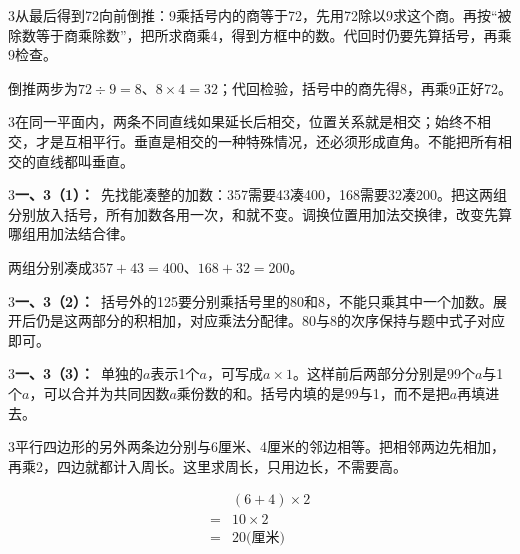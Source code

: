 \documentclass[multi=snippet,border={5bp 20bp 5bp 5bp}]{standalone}
\newenvironment{snippet}[3]{\begin{minipage}{#1bp}\color{answerred}\fontsize{#2}{#3}\selectfont\raggedright}{\end{minipage}}
\begin{document}
\begin{snippet}{505}{11.5}{14}\begin{multicols}{3}\raggedcolumns 从最后得到72向前倒推：9乘括号内的商等于72，先用72除以9求这个商。再按“被除数等于商乘除数”，把所求商乘4，得到方框中的数。代回时仍要先算括号，再乘9检查。\par 倒推两步为\(72\div9=8\)\allowbreak 、\(8\times4=32\)\allowbreak ；代回检验，括号中的商先得8，再乘9正好72。\end{multicols}\end{snippet}
\begin{snippet}{505}{11.5}{14}\begin{multicols}{3}\raggedcolumns 在同一平面内，两条不同直线如果延长后相交，位置关系就是相交；始终不相交，才是互相平行。垂直是相交的一种特殊情况，还必须形成直角。不能把所有相交的直线都叫垂直。\end{multicols}\end{snippet}
\begin{snippet}{505}{11.5}{14}\begin{multicols}{3}\raggedcolumns \textbf{一、3（1）：}\ 先找能凑整的加数：357需要43凑400，168需要32凑200。把这两组分别放入括号，所有加数各用一次，和就不变。调换位置用加法交换律，改变先算哪组用加法结合律。\par 两组分别凑成\(357+43=400\)\allowbreak 、\(168+32=200\)\allowbreak 。\end{multicols}\end{snippet}
\begin{snippet}{505}{11.5}{14}\begin{multicols}{3}\raggedcolumns \textbf{一、3（2）：}\ 括号外的125要分别乘括号里的80和8，不能只乘其中一个加数。展开后仍是这两部分的积相加，对应乘法分配律。80与8的次序保持与题中式子对应即可。\end{multicols}\end{snippet}
\begin{snippet}{505}{11.5}{14}\begin{multicols}{3}\raggedcolumns \textbf{一、3（3）：}\ 单独的\(a\)\allowbreak 表示1个\(a\)\allowbreak ，可写成\(a\times1\)\allowbreak 。这样前后两部分分别是99个\(a\)\allowbreak 与1个\(a\)\allowbreak ，可以合并为共同因数\(a\)\allowbreak 乘份数的和。括号内填的是99与1，而不是把\(a\)\allowbreak 再填进去。\end{multicols}\end{snippet}
\begin{snippet}{505}{11.5}{14}\begin{multicols}{3}\raggedcolumns 平行四边形的另外两条边分别与6厘米、4厘米的邻边相等。把相邻两边先相加，再乘2，四边就都计入周长。这里求周长，只用边长，不需要高。\par \[\begin{aligned}&(6+4)\times2\\={}&10\times2\\={}&20\text{(厘米)}\end{aligned}\]\end{multicols}\end{snippet}
\end{document}
